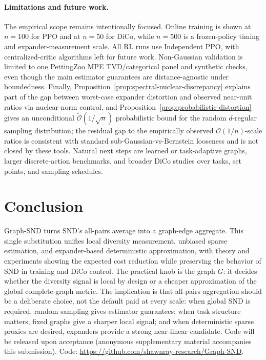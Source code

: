 \documentclass{article}
\makeatletter
\theoremstyle{plain}
\theoremstyle{definition}
\theoremstyle{remark}
\newcommand{\codelocation}{%
  \if@anonymous
    Code will be released upon acceptance (anonymous supplementary
    material accompanies this submission).%
  \else
    Code: \url{https://github.com/shawnray-research/Graph-SND}.%
  \fi
}
\makeatother
\begin{document}
\paragraph{Limitations and future work.}
The empirical scope remains intentionally focused. Online training is
shown at $n=100$ for PPO and at $n=50$ for DiCo, while $n=500$ is a
frozen-policy timing and expander-measurement scale. All RL runs use
Independent PPO, with centralized-critic algorithms left for future
work. Non-Gaussian validation is limited to one PettingZoo MPE
TVD/categorical panel and synthetic checks, even though the main
estimator guarantees are distance-agnostic under boundedness. Finally,
Proposition~\ref{prop:spectral-nuclear-discrepancy} explains part of the
gap between worst-case expander distortion and observed near-unit ratios
via nuclear-norm control, and
Proposition~\ref{prop:probabilistic-distortion} gives an unconditional
$\widetilde{\mathcal{O}}(1/\sqrt{n})$ probabilistic bound for the random
$d$-regular sampling distribution; the residual gap to the empirically
observed $\mathcal{O}(1/n)$-scale ratios is consistent with standard
sub-Gaussian-vs-Bernstein looseness and is not closed by these tools.
Natural next steps are learned or task-adaptive graphs, larger
discrete-action benchmarks, and broader DiCo studies over tasks,
set points, and sampling schedules.
\section{Conclusion}
\label{sec:conclusion}

Graph-SND turns SND's all-pairs average into a graph-edge aggregate. This
single substitution unifies local diversity measurement, unbiased sparse
estimation, and expander-based deterministic approximation, with theory
and experiments showing the expected cost reduction while preserving the
behavior of SND in training and DiCo control. The practical knob is the
graph $G$: it decides whether the diversity signal is local by design or
a cheaper approximation of the global complete-graph metric.
The implication is that all-pairs aggregation should be a deliberate
choice, not the default paid at every scale: when global SND is required,
random sampling gives estimator guarantees; when task structure matters,
fixed graphs give a sharper local signal; and when deterministic sparse
proxies are desired, expanders provide a strong near-linear candidate.
\codelocation

\clearpage


\end{document}

